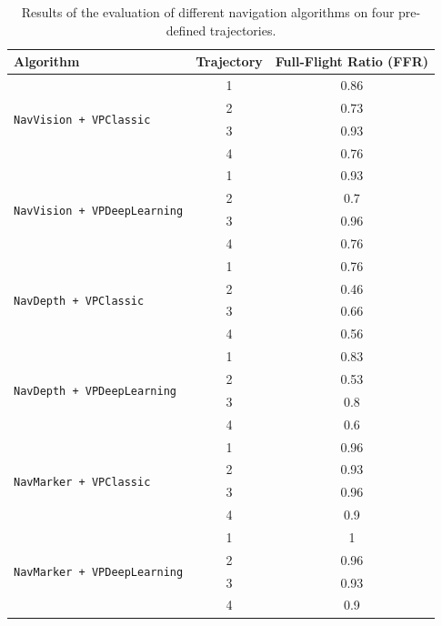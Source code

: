 \begin{table}[t]
    \centering
    \begin{tabular}{|l|c|c|}
        \hline
        \textbf{Algorithm} & \textbf{Trajectory} & \textbf{Full-Flight Ratio} (FFR) \\ \hline
        \hline
        \multirow{4}{*}{\texttt{NavVision + VPClassic}} & 1 & \num{0.86} \\ \cline{2-3}
        & 2 & \num{0.73} \\ \cline{2-3}
        & 3 & \num{0.93} \\ \cline{2-3}
        & 4 & \num{0.76} \\ \hline
        \multirow{4}{*}{\texttt{NavVision + VPDeepLearning}} & 1 & \num{0.93} \\ \cline{2-3}
        & 2 & \num{0.7} \\ \cline{2-3}
        & 3 & \num{0.96} \\ \cline{2-3}
        & 4 & \num{0.76} \\ \hline
        \multirow{4}{*}{\texttt{NavDepth + VPClassic}} & 1 & \num{0.76} \\ \cline{2-3}
        & 2 & \num{0.46} \\ \cline{2-3}
        & 3 & \num{0.66} \\ \cline{2-3}
        & 4 & \num{0.56} \\ \hline
        \multirow{4}{*}{\texttt{NavDepth + VPDeepLearning}} & 1 & \num{0.83} \\ \cline{2-3}
        & 2 & \num{0.53} \\ \cline{2-3}
        & 3 & \num{0.8} \\ \cline{2-3}
        & 4 & \num{0.6} \\ \hline
        \multirow{4}{*}{\texttt{NavMarker + VPClassic}} & 1 & \num{0.96} \\ \cline{2-3}
        & 2 & \num{0.93} \\ \cline{2-3}
        & 3 & \num{0.96} \\ \cline{2-3}
        & 4 & \num{0.9} \\ \hline
        \multirow{4}{*}{\texttt{NavMarker + VPDeepLearning}} & 1 & \num{1} \\ \cline{2-3}
        & 2 & \num{0.96} \\ \cline{2-3}
        & 3 & \num{0.93} \\ \cline{2-3}
        & 4 & \num{0.9} \\ \hline
    \end{tabular}
    \caption{Results of the evaluation of different navigation algorithms on four pre-defined trajectories.}
    \label{tab:06.evaluation.results}
\end{table}

